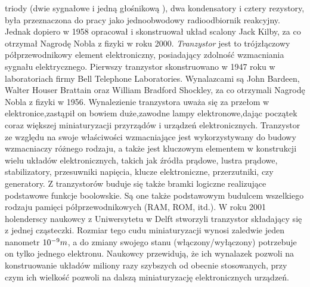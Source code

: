 \documentclass[a4paper,11pt]{article}
\begin{document}
\noindent triody (dwie sygnałowe i jedną głośnikową ), dwa kondensatory i
cztery rezystory,  była przeznaczona do pracy jako jednoobwodowy radioodbiornik reakcyjny. Jednak dopiero w 1958 opracował i skonstruował układ scalony Jack Kilby, za co otrzymał Nagrodę Nobla z fizyki w roku 2000. \textit{Tranzystor} jest to trójzłączowy półprzewodnikowy element elektroniczny, posiadający zdolność wzmacniania sygnału elektrycznego. Pierwszy tranzystor skonstruowano w 1947 roku w laboratoriach firmy Bell Telephone Laboratories. Wynalazcami są John Bardeen, Walter Houser Brattain oraz William Bradford Shockley, za co otrzymali Nagrodę Nobla z fizyki w 1956. Wynalezienie tranzystora uważa się za przełom w  elektronice,zastąpił on bowiem duże,zawodne lampy elektronowe,dając początek coraz większej miniaturyzacji przyrządów i urządzeń elektronicznych. Tranzystor ze względu na swoje właściwości wzmacniające jest wykorzystywany do budowy wzmacniaczy różnego rodzaju, a także jest kluczowym elementem w konstrukcji wielu układów elektronicznych, takich jak źródła prądowe, lustra prądowe, stabilizatory, przesuwniki napięcia, klucze elektroniczne, przerzutniki, czy generatory. Z tranzystorów buduje się także bramki logiczne realizujące podstawowe funkcje boolowskie. Są one także podstawowym budulcem wszelkiego rodzaju pamięci półprzewodnikowych (RAM, ROM, itd.). W roku 2001 holenderscy naukowcy z Uniwersytetu w Delft stworzyli tranzystor składający się z jednej cząsteczki. Rozmiar tego cudu miniaturyzacji wynosi zaledwie jeden nanometr $10^{\--9}m$, a do zmiany swojego stanu (włączony/wyłączony) potrzebuje on tylko jednego elektronu. Naukowcy przewidują, że ich wynalazek pozwoli na konstruowanie układów miliony razy szybszych od obecnie stosowanych, przy czym ich wielkość pozwoli na dalszą miniaturyzację elektronicznych urządzeń. \parfillskip=310pt
\end{document}
